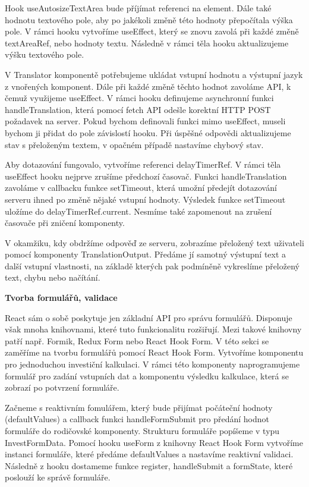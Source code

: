 Hook useAutosizeTextArea bude příjímat referenci na element. Dále také hodnotu textového pole, aby po jakékoli změně této hodnoty přepočítala výška pole. 
V rámci hooku vytvoříme useEffect, který se znovu zavolá při každé změně textAreaRef, nebo hodnoty textu. Následně v rámci těla hooku aktualizujeme výšku textového pole.

V Translator komponentě potřebujeme ukládat vstupní hodnotu a výstupní jazyk z vnořených komponent. Dále při každé změně těchto hodnot zavoláme API, k čemuž využijeme useEffect.
V rámci hooku definujeme asynchronní funkci handleTranslation, která pomocí fetch API odešle korektní HTTP POST požadavek na server. 
Pokud bychom definovali funkci mimo useEffect, museli bychom ji přidat do pole závislostí hooku.
Při úspěšné odpovědi aktualizujeme stav s přeloženým textem, v opačném případě nastavíme chybový stav.

Aby dotazování fungovalo, vytvoříme referenci delayTimerRef. V rámci těla useEffect hooku nejprve zrušíme předchozí časovač. 
Funkci handleTranslation zavoláme v callbacku funkce setTimeout, která umožní předejít dotazování serveru ihned po změně nějaké vstupní hodnoty. 
Výsledek funkce setTimeout uložíme do delayTimerRef.current. Nesmíme také zapomenout na zrušení časovače při zničení komponenty.

V okamžiku, kdy obdržíme odpověď ze serveru, zobrazíme přeložený text uživateli pomocí komponenty TranslationOutput. 
Předáme jí samotný výstupní text a další vstupní vlastnosti, na základě kterých pak podmíněně vykreslíme přeložený text, chybu nebo načítání.

\begin{flushleft}
  \textbf{Tvorba formulářů, validace}
\end{flushleft}

React sám o sobě poskytuje jen základní API pro správu formulářů. Disponuje však mnoha knihovnami, které tuto funkcionalitu rozšiřují. 
Mezi takové knihovny patří např. Formik, Redux Form nebo React Hook Form. V této sekci se zaměříme na tvorbu formulářů pomocí React Hook Form. 
Vytvoříme komponentu pro jednoduchou investiční kalkulaci. 
V rámci této komponenty naprogramujeme formulář pro zadání vstupních dat a komponentu výsledku kalkulace, která se zobrazí po potvrzení formuláře.

Začneme s reaktivním fomulářem, který bude přijímat počáteční hodnoty (defaultValues) a callback funkci handleFormSubmit pro předání hodnot formuláře do rodičovské komponenty. 
Strukturu formuláře popíšeme v typu InvestFormData. Pomocí hooku useForm z knihovny React Hook Form vytvoříme instanci formuláře, které předáme defaultValues a nastavíme reaktivní validaci. 
Následně z hooku dostameme funkce register, handleSubmit a formState, které poslouží ke správě formuláře.

